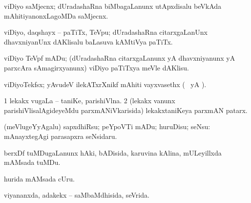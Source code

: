 {{{{{\bentry
{} 
\gl{\nA}
\expl{}
\bmng
 viDiyo saMjecnx; dUradashaRna biMbagaLanunx utApxdisalu beVkAda mAhitiyanonxLagoMDa saMjecnx. 
\emng
\eentry

\bentry
   
\gl{\nA}
\expl{}
\bmng
 viDiyo, daqshayx -- paTiTx, TeVpu; dUradashaRna citarxgaLanUnx dhavxniyanUnx dAKlisalu baLasuva kAMtiVya paTiTx. 
\emng
\eentry

\bentry 
{} 
\gl{\sakirx}
\expl{}
\bmng
 viDiyo TeVpf mADu; (dUradashaRna citarxgaLanunx yA dhavxniyanunx yA parxcAra sAmagirxyanunx) viDiyo paTiTxya meVle dAKlisu. 
\emng
\eentry

\bentry
{}
\gl{\nA}
\expl{}
\bmng
\emng
\eentry

\bentry
{} 
\gl{\nA}
\expl{}
\bmng
 viDiyoTekfsx; yAvudeV ilekATxrXnikf mAhiti vayxvasethx (\kanmu\  yA ). 
\emng
\eentry

\bentry
{} 
\gl{\nA}
\expl{}
\bmng
\emng
\eentry

\bentry
{} 
\gl{\nA}
\expl{}
\bmng
\bnum
\num{1} lekakx \mo vugaLa -- taniKe, parishiVlna. 
\num{2} (lekakx \mo vanunx parishiVlisalAgideyeMdu parxmANiVkarisida) lekakxtaniKeya parxmAN patarx. 
\enum
\emng
\eentry

\bentry
{} 
\gl{\akirx}
\bmng
 (meVlugeYyAgalu) sapxdhiRsu; peYpoVTi mADu; huruDisu; seNsu:  mAnayxtegAgi parasapxra seNsidaru. 
\emng
\eentry

\bentry
{} 
\gl{\nA}
\expl{}
\bmng
\emng
\eentry

\bentry
{} 
\gl{\nA}
\expl{}
\bmng
 berxDf tuMDugaLanunx hAki, bADisida, karuvina kAlina, mULeyillxda mAMsada tuMDu. 
\emng
\eentry

\bentry
{}
\gl{\nA}
\expl{}
\bmng
 hurida mAMsada cUru. 
\emng
\eentry

\bentry
{} 
\gl{\gu}
\expl{}
\bmng
 viyananxda, adakekx -- saMbaMdhisida, seVrida. 
\emng
\eentry

}}}}}
